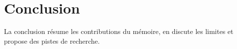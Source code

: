 \chapter{Conclusion}
\label{chap:conclusion}

La conclusion résume les contributions du mémoire, en discute les limites et
propose des pistes de recherche.
